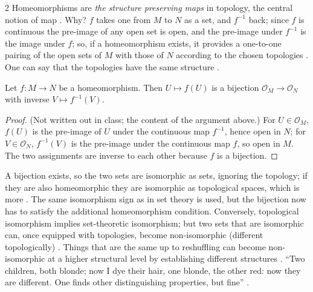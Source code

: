 \begin{paracol}{2}
Homeomorphisms are \emph{the structure preserving maps} in topology, the central notion of map . Why? $f$ takes
one from $M$ to $N$ as a set, and $f^{-1}$ back; since $f$ is continuous the pre-image of any open set is open, and the
pre-image under $f^{-1}$ is the image under $f$; so, if a homeomorphism exists, it provides a one-to-one pairing of the open sets of $M$ with those of $N$
according to the chosen topologies . One can say that the topologies
have the same structure .

\begin{proposition}\label{prop:to-homeo-pair}
Let $f\colon M\to N$ be a homeomorphism. Then $U\mapsto f(U)$ is a bijection $\mathcal O_M\to\mathcal O_N$ with inverse $V\mapsto f^{-1}(V)$.
\end{proposition}
\begin{proof}
(Not written out in class; the content of the argument above.) For $U\in\mathcal O_M$, $f(U)$ is the pre-image of $U$ under the continuous map
$f^{-1}$, hence open in $N$; for $V\in\mathcal O_N$, $f^{-1}(V)$ is the pre-image under the continuous map $f$, so open in $M$. The two assignments are inverse to each other
because $f$ is a bijection.
\end{proof}

\begin{intuition}\label{int:to-hair}
A bijection exists, so the two sets are isomorphic as sets, ignoring the topology; if they are also homeomorphic they are isomorphic as topological
spaces, which is more . The same isomorphism sign as in set theory is used, but the bijection
now has to satisfy the additional homeomorphism condition. Conversely, topological isomorphism implies set-theoretic isomorphism; but two sets that are
isomorphic can, once equipped with topologies, become non-isomorphic (different topologically) .
Things that are the same up to reshuffling can become non-isomorphic at a higher structural level by establishing different structures
. ``Two children, both blonde; now I dye their hair, one blonde, the other red: now they are different. One finds other distinguishing
properties, but fine'' .
\end{intuition}


\end{paracol}
